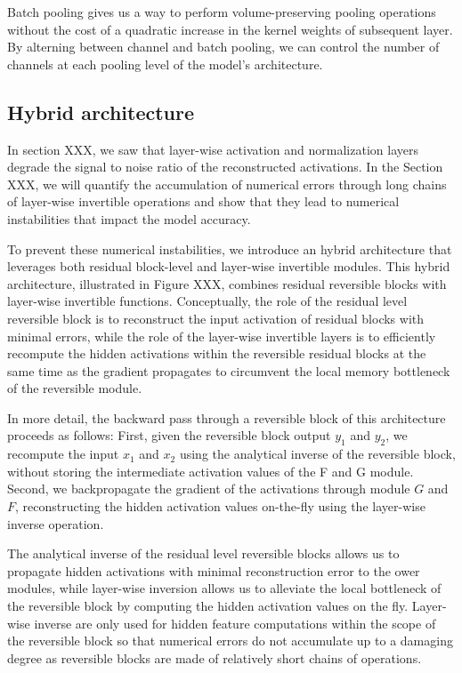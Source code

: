 \documentclass[twocolumn]{bmcart}
\begin{document}
Batch pooling gives us a way to perform volume-preserving pooling operations without the cost of a quadratic increase in the kernel weights of subsequent layer. 
By alterning between channel and batch pooling, we can control the number of channels at each pooling level of the model's architecture.

\subsection{Hybrid architecture}

In section XXX, we saw that layer-wise activation and normalization layers degrade the signal to noise ratio of the reconstructed activations.
In the Section XXX, we will quantify the accumulation of numerical errors through long chains of layer-wise invertible operations and show that they lead to numerical instabilities that impact the model accuracy.

To prevent these numerical instabilities, we introduce an hybrid architecture that leverages both residual block-level and layer-wise invertible modules.
This hybrid architecture, illustrated in Figure XXX, combines residual reversible blocks with layer-wise invertible functions. 
Conceptually, the role of the residual level reversible block is to reconstruct the input activation of residual blocks with minimal errors, while the role of the layer-wise invertible layers is to efficiently recompute the hidden activations within the reversible residual blocks at the same time as the gradient propagates to circumvent the local memory bottleneck of the reversible module.

In more detail, the backward pass through a reversible block of this architecture proceeds as follows: 
First, given the reversible block output $y_1$ and $y_2$, we recompute the input $x_1$ and $x_2$ using the analytical inverse of the reversible block, without storing the intermediate activation values of the F and G module.
Second, we backpropagate the gradient of the activations through module $G$ and $F$, reconstructing the hidden activation values on-the-fly using the layer-wise inverse operation.

The analytical inverse of the residual level reversible blocks allows us to propagate hidden activations with minimal reconstruction error to the ower modules, while layer-wise inversion allows us to alleviate the local bottleneck of the reversible block by computing the hidden activation values on the fly. Layer-wise inverse are only used for hidden feature computations within the scope of the reversible block so that numerical errors do not accumulate up to a damaging degree as reversible blocks are made of relatively short chains of operations.
\end{document}
